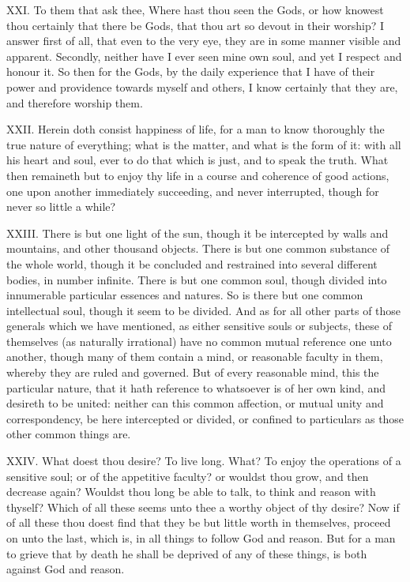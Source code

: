 XXI. To them that ask thee, Where hast thou seen the Gods, or how
knowest thou certainly that there be Gods, that thou art so devout in
their worship? I answer first of all, that even to the very eye, they are
in some manner visible and apparent. Secondly, neither have I ever seen
mine own soul, and yet I respect and honour it. So then for the Gods, by
the daily experience that I have of their power and providence towards
myself and others, I know certainly that they are, and therefore worship
them.

XXII. Herein doth consist happiness of life, for a man to know
thoroughly the true nature of everything; what is the matter, and what is
the form of it: with all his heart and soul, ever to do that which is
just, and to speak the truth. What then remaineth but to enjoy thy life in
a course and coherence of good actions, one upon another immediately
succeeding, and never interrupted, though for never so little a while?

XXIII. There is but one light of the sun, though it be intercepted by
walls and mountains, and other thousand objects. There is but one common
substance of the whole world, though it be concluded and restrained into
several different bodies, in number infinite. There is but one common
soul, though divided into innumerable particular essences and natures. So
is there but one common intellectual soul, though it seem to be divided.
And as for all other parts of those generals which we have mentioned, as
either sensitive souls or subjects, these of themselves (as naturally
irrational) have no common mutual reference one unto another, though many
of them contain a mind, or reasonable faculty in them, whereby they are
ruled and governed. But of every reasonable mind, this the particular
nature, that it hath reference to whatsoever is of her own kind, and
desireth to be united: neither can this common affection, or mutual unity
and correspondency, be here intercepted or divided, or confined to
particulars as those other common things are.

XXIV. What doest thou desire? To live long. What? To enjoy the
operations of a sensitive soul; or of the appetitive faculty? or wouldst
thou grow, and then decrease again? Wouldst thou long be able to talk, to
think and reason with thyself? Which of all these seems unto thee a worthy
object of thy desire? Now if of all these thou doest find that they be but
little worth in themselves, proceed on unto the last, which is, in all
things to follow God and reason. But for a man to grieve that by death he
shall be deprived of any of these things, is both against God and reason.

